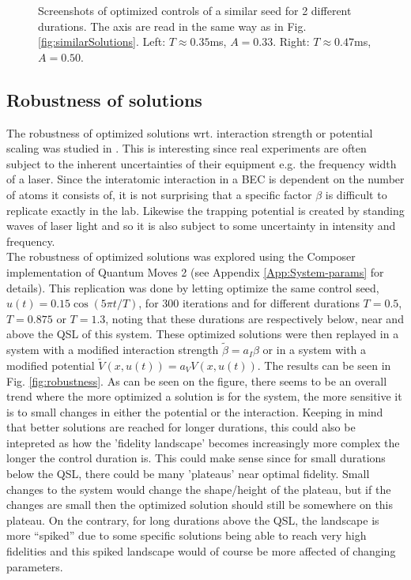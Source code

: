 \documentclass[a4paper, twocolumn]{revtex4-1}
\begin{document}
\begin{figure}
\begin{subfigure}{0.4\columnwidth}
	\end{subfigure}
	\caption{Screenshots of optimized controls of a similar seed for 2 different durations. The axis are read in the same way as in Fig. \ref{fig:similarSolutions}. Left: $T\approx 0.35$ms, $A=0.33$. Right: $T\approx 0.47$ms, $A=0.50$.}
	\label{fig:SimilarTimescales}
\end{figure}

\subsection{\label{subsec:robustness} Robustness of solutions}
The robustness of optimized solutions wrt. interaction strength or potential scaling was studied in \cite{GroupPaper}. This is interesting since real experiments are often subject to the inherent uncertainties of their equipment e.g. the frequency width of a laser. Since the interatomic interaction in a BEC is dependent on the number of atoms it consists of, it is not surprising that a specific factor $\beta$ is difficult to replicate exactly in the lab. Likewise the trapping potential is created by standing waves of laser light and so it is also subject to some uncertainty in intensity and frequency.  \\
The robustness of optimized solutions was explored using the Composer implementation of Quantum Moves 2 (see Appendix \ref{App:System-params} for details). This replication was done by letting  optimize the same control seed, $u(t)=0.15\cos(5\pi t/T)$, for $300$ iterations and for different durations $T=0.5$, $T=0.875$ or $T=1.3$, noting that these durations are respectively below, near and above the QSL of this system. These optimized solutions were then replayed in a system with a modified interaction strength $\tilde{\beta} = a_I \beta$ or in a system with a modified potential $\tilde{V}(x,u(t)) = a_V V(x,u(t))$. The results can be seen in Fig. \ref{fig:robustness}. As can be seen on the figure, there seems to be an overall trend where the more optimized a solution is for the system, the more sensitive it is to small changes in either the potential or the interaction. Keeping in mind that better solutions are reached for longer durations, this could also be intepreted as how the 'fidelity landscape' becomes increasingly more complex the longer the control duration is. This could make sense since for small durations below the QSL, there could be many 'plateaus' near optimal fidelity. Small changes to the system would change the shape/height of the plateau, but if the changes are small then the optimized solution should still be somewhere on this plateau. On the contrary, for long durations above the QSL, the landscape is more ``spiked'' due to some specific solutions being able to reach very high fidelities and this spiked landscape would of course be more affected of changing parameters. \\
\end{document}
